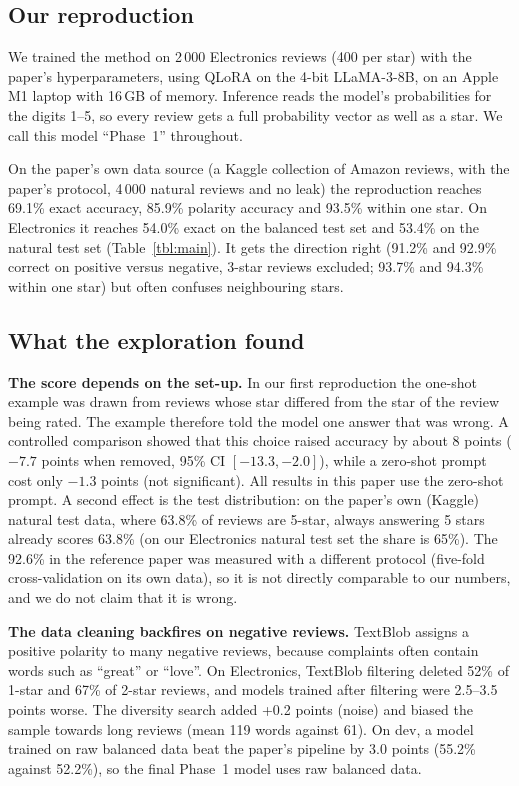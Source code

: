 \documentclass[runningheads]{llncs}
\begin{document}
\subsection{Our reproduction}

We trained the method on 2\,000 Electronics reviews (400 per star) with the paper's hyperparameters, using QLoRA on the 4-bit LLaMA-3-8B, on an Apple M1 laptop with 16\,GB of memory. Inference reads the model's probabilities for the digits 1--5, so every review gets a full probability vector as well as a star. We call this model ``Phase~1'' throughout.

On the paper's own data source (a Kaggle collection of Amazon reviews, with the paper's protocol, 4\,000 natural reviews and no leak) the reproduction reaches 69.1\% exact accuracy, 85.9\% polarity accuracy and 93.5\% within one star. On Electronics it reaches 54.0\% exact on the balanced test set and 53.4\% on the natural test set (Table~\ref{tbl:main}). It gets the direction right (91.2\% and 92.9\% correct on positive versus negative, 3-star reviews excluded; 93.7\% and 94.3\% within one star) but often confuses neighbouring stars.

\subsection{What the exploration found}

\textbf{The score depends on the set-up.} In our first reproduction the one-shot example was drawn from reviews whose star differed from the star of the review being rated. The example therefore told the model one answer that was wrong. A controlled comparison showed that this choice raised accuracy by about 8 points ($-7.7$ points when removed, 95\% CI $[-13.3, -2.0]$), while a zero-shot prompt cost only $-1.3$ points (not significant). All results in this paper use the zero-shot prompt. A second effect is the test distribution: on the paper's own (Kaggle) natural test data, where 63.8\% of reviews are 5-star, always answering 5 stars already scores 63.8\% (on our Electronics natural test set the share is 65\%). The 92.6\% in the reference paper was measured with a different protocol (five-fold cross-validation on its own data), so it is not directly comparable to our numbers, and we do not claim that it is wrong.

\textbf{The data cleaning backfires on negative reviews.} TextBlob assigns a positive polarity to many negative reviews, because complaints often contain words such as ``great'' or ``love''. On Electronics, TextBlob filtering deleted 52\% of 1-star and 67\% of 2-star reviews, and models trained after filtering were 2.5--3.5 points worse. The diversity search added +0.2 points (noise) and biased the sample towards long reviews (mean 119 words against 61). On dev, a model trained on raw balanced data beat the paper's pipeline by 3.0 points (55.2\% against 52.2\%), so the final Phase~1 model uses raw balanced data.
\end{document}
